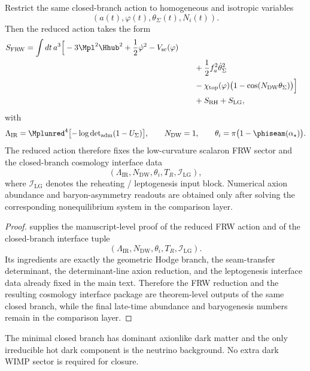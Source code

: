 \begin{theorem}
\label{thm:frw-cosmology-derivation}
Restrict the same closed-branch action to homogeneous and isotropic variables
\[
(a(t),\varphi(t),\theta_\Sigma(t),N_i(t)).
\]
Then the reduced action takes the form
\[
\begin{aligned}
S_{\mathrm{FRW}}
=
\int dt\,a^3\Big[
-3\Mpl^2\Hhub^2
+\frac12\dot\varphi^2
-V_{\mathrm{sc}}(\varphi)
\\
&\qquad
+\frac12 f_a^2\dot\theta_\Sigma^2
\\
&\qquad
-\chi_{\mathrm{top}}(\varphi)\bigl(1-\cos(N_{\mathrm{DW}}\theta_\Sigma)\bigr)
\Big]
\\
&\qquad
+S_{\mathrm{RH}}+S_{\mathrm{LG}},
\end{aligned}
\]
with
\[
\Lambda_{\mathrm{IR}}
=
\Mplunred^4\bigl[-\log\det\nolimits_{\mathrm{adm}}(1-U_\Sigma)\bigr],
\qquad
N_{\mathrm{DW}}=1,
\qquad
\theta_i=\pi\bigl(1-\phiseam(\alpha_\star)\bigr).
\]
The reduced action therefore fixes the low-curvature scalaron FRW sector and the closed-branch
cosmology interface data
\[
(\Lambda_{\mathrm{IR}},N_{\mathrm{DW}},\theta_i,T_R,\mathcal I_{\mathrm{LG}}),
\]
where $\mathcal I_{\mathrm{LG}}$ denotes the reheating / leptogenesis input block. Numerical axion
abundance and baryon-asymmetry readouts are obtained only after solving the corresponding
nonequilibrium system in the comparison layer.
\end{theorem}

\begin{proof}
 supplies the manuscript-level proof of the reduced FRW action
and of the closed-branch interface tuple
\[
(\Lambda_{\mathrm{IR}},N_{\mathrm{DW}},\theta_i,T_R,\mathcal I_{\mathrm{LG}}).
\]
Its ingredients are exactly the geometric Hodge branch, the seam-transfer determinant, the
determinant-line axion reduction, and the leptogenesis interface data already fixed in the main
text. Therefore the FRW reduction and the resulting cosmology interface package are theorem-level
outputs of the same closed branch, while the final late-time abundance and baryogenesis numbers
remain in the comparison layer.
\end{proof}

\begin{corollary}
The minimal closed branch has dominant axionlike dark matter and the only
irreducible hot dark component is the neutrino background. No extra dark WIMP sector is required
for closure.
\end{corollary}

